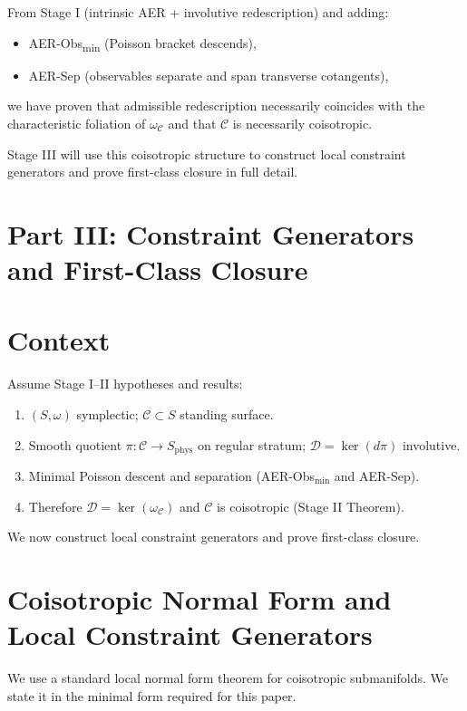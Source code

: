 \documentclass[11pt]{article}
\theoremstyle{remark}
\theoremstyle{plain}
\begin{document}
From Stage I (intrinsic AER + involutive redescription) and adding:
\begin{itemize}
\item AER-Obs\textsubscript{min} (Poisson bracket descends),
\item AER-Sep (observables separate and span transverse cotangents),
\end{itemize}
we have proven that admissible redescription necessarily coincides with the characteristic foliation of $\omega_{\mathcal{C}}$ and that $\mathcal{C}$ is necessarily coisotropic.

Stage III will use this coisotropic structure to construct local constraint generators and prove first-class closure in full detail.



\section*{Part III: Constraint Generators and First-Class Closure}




\section{Context}

Assume Stage I--II hypotheses and results:
\begin{enumerate}
\item $(S,\omega)$ symplectic; $\mathcal{C}\subset S$ standing surface.
\item Smooth quotient $\pi:\mathcal{C}\to S_{\mathrm{phys}}$ on regular stratum; $\mathcal{D}=\ker(d\pi)$ involutive.
\item Minimal Poisson descent and separation (AER-Obs$_{\min}$ and AER-Sep).
\item Therefore $\mathcal{D}=\ker(\omega_{\mathcal{C}})$ and $\mathcal{C}$ is coisotropic (Stage II Theorem).
\end{enumerate}

We now construct local constraint generators and prove first-class closure.

\section{Coisotropic Normal Form and Local Constraint Generators}

We use a standard local normal form theorem for coisotropic submanifolds.
We state it in the minimal form required for this paper.
\end{document}
